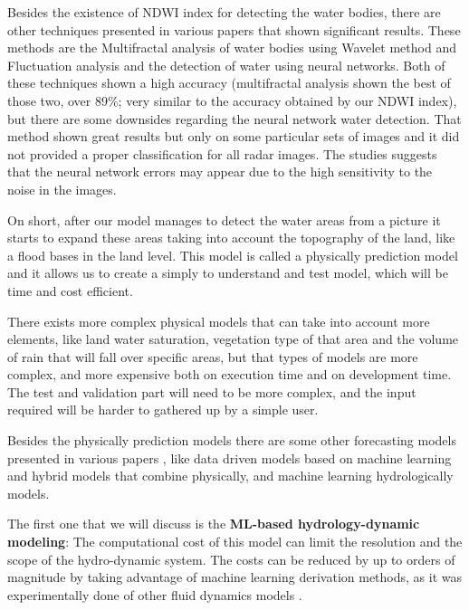 \documentclass[12pt, a4paper]{report}
\begin{document}
Besides the existence of NDWI index for detecting the water bodies, there are other techniques presented in various papers \cite{Multifractal water analysis, NDWI Comparison} that shown significant results. These methods are the Multifractal analysis of water bodies using Wavelet method and Fluctuation analysis and the detection of water using neural networks. Both of these techniques shown a high accuracy (multifractal analysis shown the best of those two, over 89\%; very similar to the accuracy obtained by our NDWI index), but there are some downsides regarding the neural network water detection. That method shown great results but only on some particular sets of images and it did not provided a proper classification for all radar images. The studies \cite{NDWI Comparison} suggests that the neural network errors may appear due to the high sensitivity to the noise in the images. 
\par 

On short, after our model manages to detect the water areas from a picture it starts to expand these areas taking into account the topography of the land, like a flood bases in the land level. This model is called a physically prediction model and it allows us to create a simply to understand and test model, which will be time and cost efficient. 
\par 

There exists more complex physical models that can take into account more elements, like land water saturation, vegetation type of that area and the volume of rain that will fall over specific areas, but that types of models are more complex, and more expensive both on execution time and on development time. The test and validation part will need to be more complex, and the input required will be harder to gathered up by a simple user. 
\par 

Besides the physically prediction models there are some other forecasting models presented in various papers \cite{Flood forecasting models}, like data driven models based on machine learning and hybrid models that combine physically, and machine learning hydrologically models.\par 

The first one that we will discuss is the \textbf{ML-based hydrology-dynamic modeling}: The computational cost of this model can limit the resolution and the scope of the hydro-dynamic system. The costs can be reduced by up to orders of magnitude by taking advantage of machine learning derivation methods, as it was experimentally done of other fluid dynamics models \cite{Yohai}.
\par 
\end{document}
